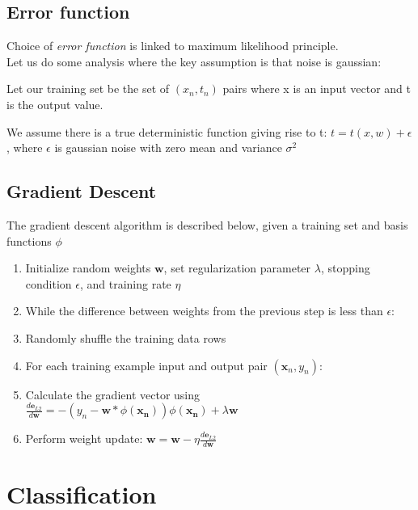 \documentclass[a4paper]{article}
\begin{document}
	\subsection{Error function}
	Choice of \textit{error function} is linked to maximum likelihood principle. \\
	
	Let us do some analysis where the key assumption is that noise is gaussian:
	
	Let our training set be the set of ${(x_n, t_n)}$ pairs where x is an input
	vector and t is the output value.
	
	We assume there is a true deterministic function giving rise to t:
	$t = t(x, w) + \epsilon$, where $\epsilon$ is gaussian noise with zero mean and
	variance $\sigma^2$
	
	\subsection{Gradient Descent}
	
	The gradient descent algorithm is described below, given a training set and basis functions $\phi$

	\begin{enumerate}
	
	\item Initialize random weights $\pmb{w}$, set regularization parameter $\lambda$, stopping condition $\epsilon$, and training rate $\eta$
	\item While the difference between weights from the previous step is less than $\epsilon$:
	
	\setlength{\itemindent}{2em}
	\item Randomly shuffle the training data rows
	\item For each training example input and output pair $(\pmb{x}_n, y_n)$:
	
	\setlength{\itemindent}{4em}
	\item Calculate the gradient vector using \newline  
	$\frac{d\pmb{e}_{L2}}{d\pmb{w}} = -(y_n - \pmb{w} * \phi(\pmb{x_n}))\phi(\pmb{x_n}) + \lambda\pmb{w}$
	
	\item Perform weight update: $\pmb{w} = \pmb{w} - \eta \frac{d\pmb{e}_{L2}}{d\pmb{w}}$
	
	\end{enumerate}
	
	\clearpage
	\section{Classification} \cite{elements}
	
\end{document}
